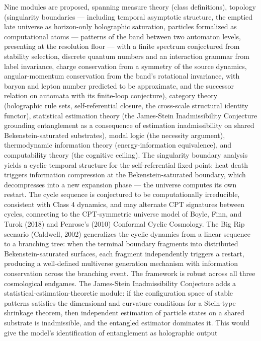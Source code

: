 \documentclass[
]{article}
\begin{document}
Nine modules are proposed, spanning measure theory (class definitions),
topology (singularity boundaries --- including temporal asymptotic
structure, the emptied late universe as horizon-only holographic
saturation, particles formalized as computational atoms --- patterns of
the band between two automaton levels, presenting at the resolution
floor --- with a finite spectrum conjectured from stability selection,
discrete quantum numbers and an interaction grammar from label
invariance, charge conservation from a symmetry of the source dynamics,
angular-momentum conservation from the band's rotational invariance,
with baryon and lepton number predicted to be approximate, and the
successor relation on automata with its finite-loop conjecture),
category theory (holographic rule sets, self-referential closure, the
cross-scale structural identity functor), statistical estimation theory
(the James-Stein Inadmissibility Conjecture grounding entanglement as a
consequence of estimation inadmissibility on shared Bekenstein-saturated
substrates), modal logic (the necessity argument), thermodynamic
information theory (energy-information equivalence), and computability
theory (the cognitive ceiling). The singularity boundary analysis yields
a cyclic temporal structure for the self-referential fixed point: heat
death triggers information compression at the Bekenstein-saturated
boundary, which decompresses into a new expansion phase --- the universe
computes its own restart. The cycle sequence is conjectured to be
computationally irreducible, consistent with Class 4 dynamics, and may
alternate CPT signatures between cycles, connecting to the CPT-symmetric
universe model of Boyle, Finn, and Turok (2018) and Penrose's (2010)
Conformal Cyclic Cosmology. The Big Rip scenario (Caldwell, 2002)
generalizes the cyclic dynamics from a linear sequence to a branching
tree: when the terminal boundary fragments into distributed
Bekenstein-saturated surfaces, each fragment independently triggers a
restart, producing a well-defined multiverse generation mechanism with
information conservation across the branching event. The framework is
robust across all three cosmological endgames. The James-Stein
Inadmissibility Conjecture adds a statistical-estimation-theoretic
module: if the configuration space of stable patterns satisfies the
dimensional and curvature conditions for a Stein-type shrinkage theorem,
then independent estimation of particle states on a shared substrate is
inadmissible, and the entangled estimator dominates it. This would give
the model's identification of entanglement as holographic output
\end{document}
